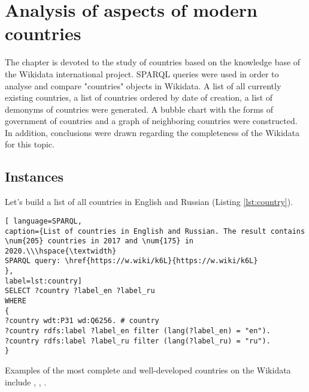 \setchapterpreamble[u]{\margintoc}
\chapter{Analysis of aspects of modern countries\protect\footnotemark}


The chapter is devoted to the study of countries based on the knowledge base of the Wikidata international project. SPARQL queries were used in order to analyse and compare "countries" objects in Wikidata. A list of all currently existing countries, a list of countries ordered by date of creation, a list of demonyms of countries were generated. A bubble chart with the forms of government of countries and a graph of neighboring countries were constructed. In addition, conclusions were drawn regarding the completeness of the Wikidata for this topic.

\section{Instances}

Let's build a list of all countries in English and Russian (Listing \ref{lst:country}).

\begin{lstlisting}[ language=SPARQL, 
caption={List of countries in English and Russian. The result contains \num{205} countries in 2017 and \num{175} in 2020.\\\hspace{\textwidth}
SPARQL query: \href{https://w.wiki/k6L}{https://w.wiki/k6L}
},
label=lst:country]
SELECT ?country ?label_en ?label_ru
WHERE
{
?country wdt:P31 wd:Q6256. # country
?country rdfs:label ?label_en filter (lang(?label_en) = "en").
?country rdfs:label ?label_ru filter (lang(?label_ru) = "ru").
}
\end{lstlisting}


Examples of the most complete and well-developed countries on the Wikidata include , , .

